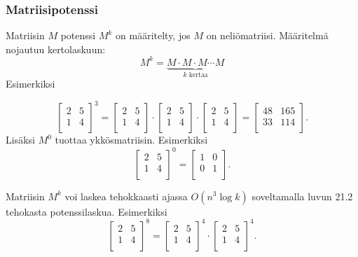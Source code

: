 \subsubsection{Matriisipotenssi}

Matriisin $M$ potenssi $M^k$ on
määritelty, jos $M$ on neliömatriisi.
Määritelmä nojautuu kertolaskuun:
\[ M^k = \underbrace{M \cdot M \cdot M \cdots M}_{\textrm{$k$ kertaa}} \]
Esimerkiksi

\[
 \begin{bmatrix}
  2 & 5 \\
  1 & 4 \\
 \end{bmatrix}^3 =
 \begin{bmatrix}
  2 & 5 \\
  1 & 4 \\
 \end{bmatrix} \cdot
 \begin{bmatrix}
  2 & 5 \\
  1 & 4 \\
 \end{bmatrix} \cdot
 \begin{bmatrix}
  2 & 5 \\
  1 & 4 \\
 \end{bmatrix} =
 \begin{bmatrix}
  48 & 165 \\
  33 & 114 \\
 \end{bmatrix}.
\]
Lisäksi $M^0$ tuottaa ykkösmatriisin. Esimerkiksi
\[
 \begin{bmatrix}
  2 & 5 \\
  1 & 4 \\
 \end{bmatrix}^0 =
 \begin{bmatrix}
  1 & 0 \\
  0 & 1 \\
 \end{bmatrix}.
\]

Matriisin $M^k$ voi laskea tehokkaasti ajassa
$O(n^3 \log k)$ soveltamalla luvun 21.2
tehokasta potenssilaskua. Esimerkiksi
\[
 \begin{bmatrix}
  2 & 5 \\
  1 & 4 \\
 \end{bmatrix}^8 =
 \begin{bmatrix}
  2 & 5 \\
  1 & 4 \\
 \end{bmatrix}^4 \cdot
 \begin{bmatrix}
  2 & 5 \\
  1 & 4 \\
 \end{bmatrix}^4.
\]


